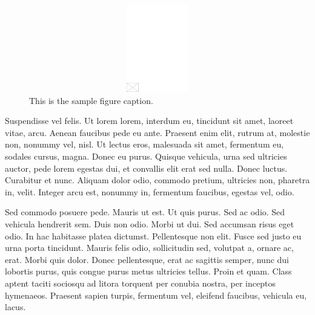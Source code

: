 \documentclass[AMS,STIX2COL]{WileyNJD-v2}
\begin{document}
    \begin{figure}[t]
        \centerline{\includegraphics[width=342pt,height=9pc,draft]{empty}}
        \caption{This is the sample figure caption.\label{fig1}}
    \end{figure}

    Suspendisse vel felis. Ut lorem lorem, interdum eu, tincidunt sit amet, laoreet vitae, arcu. Aenean faucibus pede eu
    ante. Praesent enim elit, rutrum at, molestie non, nonummy vel, nisl. Ut lectus eros, malesuada sit amet, fermentum
    eu, sodales cursus, magna. Donec eu purus. Quisque vehicula, urna sed ultricies auctor, pede lorem egestas dui, et
    convallis elit erat sed nulla. Donec luctus. Curabitur et nunc. Aliquam dolor odio, commodo pretium, ultricies non,
    pharetra in, velit. Integer arcu est, nonummy in, fermentum faucibus, egestas vel, odio.

    Sed commodo posuere pede. Mauris ut est. Ut quis purus. Sed ac odio. Sed vehicula hendrerit sem. Duis non
    odio. Morbi ut dui. Sed accumsan risus eget odio. In hac habitasse platea dictumst. Pellentesque non elit. Fusce
    sed justo eu urna porta tincidunt. Mauris felis odio, sollicitudin sed, volutpat a, ornare ac, erat. Morbi quis dolor.
    Donec pellentesque, erat ac sagittis semper, nunc dui lobortis purus, quis congue purus metus ultricies tellus. Proin
    et quam. Class aptent taciti sociosqu ad litora torquent per conubia nostra, per inceptos hymenaeos. Praesent sapien
    turpis, fermentum vel, eleifend faucibus, vehicula eu, lacus.
\end{document}
